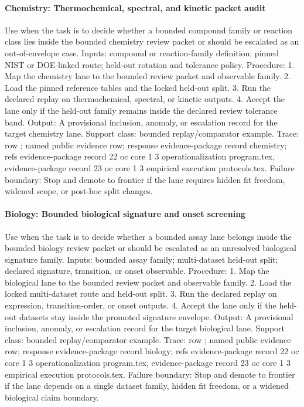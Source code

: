 \paragraph{Chemistry: Thermochemical, spectral, and kinetic packet audit}
Use when the task is to decide whether a bounded compound family or reaction class lies inside the bounded chemistry review packet or should be escalated as an out-of-envelope case.
Inputs: compound or reaction-family definition; \allowbreak pinned NIST or DOE-linked route; \allowbreak held-out rotation and tolerance policy.
Procedure: 1. Map the chemistry lane to the bounded review packet and observable family. 2. Load the pinned reference tables and the locked held-out split. 3. Run the declared replay on thermochemical, spectral, or kinetic outputs. 4. Accept the lane only if the held-out family remains inside the declared review tolerance band.
Output: A provisional inclusion, anomaly, or escalation record for the target chemistry lane.
Support class: bounded replay/comparator example.
Trace: row ; named public evidence row; \allowbreak response evidence-package record chemistry; \allowbreak refs evidence-package record 22 oc core 1 3 operationalization program.tex, \allowbreak evidence-package record 23 oc core 1 3 empirical execution protocols.tex.
Failure boundary: Stop and demote to frontier if the lane requires hidden fit freedom, widened scope, or post-hoc split changes.

\paragraph{Biology: Bounded biological signature and onset screening}
Use when the task is to decide whether a bounded assay lane belongs inside the bounded biology review packet or should be escalated as an unresolved biological signature family.
Inputs: bounded assay family; \allowbreak multi-dataset held-out split; \allowbreak declared signature, transition, or onset observable.
Procedure: 1. Map the biological lane to the bounded review packet and observable family. 2. Load the locked multi-dataset route and held-out split. 3. Run the declared replay on expression, transition-order, or onset outputs. 4. Accept the lane only if the held-out datasets stay inside the promoted signature envelope.
Output: A provisional inclusion, anomaly, or escalation record for the target biological lane.
Support class: bounded replay/comparator example.
Trace: row ; named public evidence row; \allowbreak response evidence-package record biology; \allowbreak refs evidence-package record 22 oc core 1 3 operationalization program.tex, \allowbreak evidence-package record 23 oc core 1 3 empirical execution protocols.tex.
Failure boundary: Stop and demote to frontier if the lane depends on a single dataset family, hidden fit freedom, or a widened biological claim boundary.

